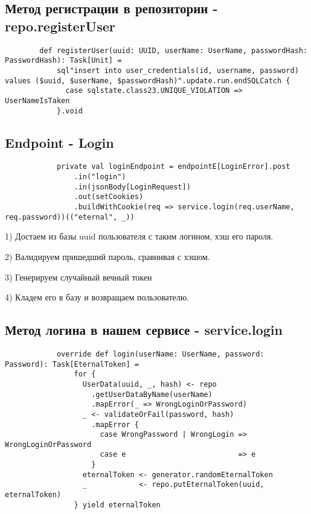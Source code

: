 \documentclass[14pt]{extarticle}
\begin{document}
    \subsection{Метод регистрации в репозитории - repo.registerUser}
    \begin{verbatim}
        def registerUser(uuid: UUID, userName: UserName, passwordHash: PasswordHash): Task[Unit] =
            sql"insert into user_credentials(id, username, password) values ($uuid, $userName, $passwordHash)".update.run.endSQLCatch {
              case sqlstate.class23.UNIQUE_VIOLATION => UserNameIsTaken
            }.void
    \end{verbatim}

    \subsection{Endpoint - Login}
    \begin{verbatim}
            private val loginEndpoint = endpointE[LoginError].post
                .in("login")
                .in(jsonBody[LoginRequest])
                .out(setCookies)
                .buildWithCookie(req => service.login(req.userName, req.password))(("eternal", _))
    \end{verbatim}

    1) Достаем из базы uuid пользователя с таким логином, хэш его пароля.

    2) Валидируем пришедший пароль, сравнивая с хэшом.

    3) Генерируем случайный вечный токен

    4) Кладем его в базу и возвращаем пользователю.

    \subsection{Метод логина в нашем сервисе - service.login}
    \begin{verbatim}
            override def login(userName: UserName, password: Password): Task[EternalToken] =
                for {
                  UserData(uuid, _, hash) <- repo
                    .getUserDataByName(userName)
                    .mapError(_ => WrongLoginOrPassword)
                  _ <- validateOrFail(password, hash)
                    .mapError {
                      case WrongPassword | WrongLogin => WrongLoginOrPassword
                      case e                          => e
                    }
                  eternalToken <- generator.randomEternalToken
                  _            <- repo.putEternalToken(uuid, eternalToken)
                } yield eternalToken
    \end{verbatim}
\end{document}
